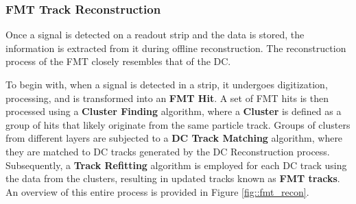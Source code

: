 \subsubsection{FMT Track Reconstruction}
\label{sssec::fmt_track_reconstruction}
    Once a signal is detected on a readout strip and the data is stored, the information is extracted from it during offline reconstruction.
    The reconstruction process of the FMT closely resembles that of the DC.

    To begin with, when a signal is detected in a strip, it undergoes digitization, processing, and is transformed into an \textbf{FMT Hit}.
    A set of FMT hits is then processed using a \textbf{Cluster Finding} algorithm, where a \textbf{Cluster} is defined as a group of hits that likely originate from the same particle track.
    Groups of clusters from different layers are subjected to a \textbf{DC Track Matching} algorithm, where they are matched to DC tracks generated by the DC Reconstruction process.
    Subsequently, a \textbf{Track Refitting} algorithm is employed for each DC track using the data from the clusters, resulting in updated tracks known as \textbf{FMT tracks}.
    An overview of this entire process is provided in Figure \ref{fig::fmt_recon}.
